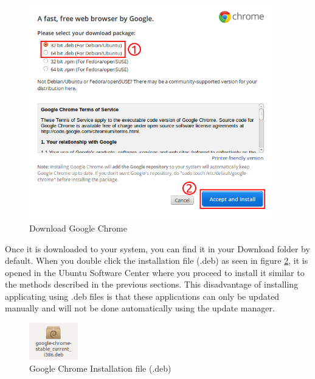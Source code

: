 \begin{figure}[h!]	
	\centering
	\includegraphics[width=300pt]{./images/applications/chrome-download.png}
	\caption{Download Google Chrome}	
	\label{fig:chrome-download}		
\end{figure}

\par \noindent Once it is downloaded to your system, you can find it in your Download folder by default. When you double click the installation file (.deb) as seen in figure \ref{fig:debfile-icon}, it is opened in the Ubuntu Software Center where you proceed to install it similar to the methods described in the previous sections. This disadvantage of installing applicating using .deb files is that these applications can only be updated manually and will not be done automatically using the update manager. \\

\begin{figure}[h!]	
	\centering
	\includegraphics[width=60pt]{./images/applications/debfile-icon.png}
	\caption{Google Chrome Installation file (.deb)}	
	\label{fig:debfile-icon}		
\end{figure}

\par \noindent {} \\


